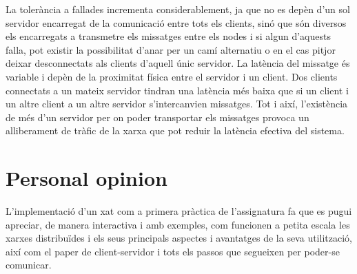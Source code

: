 \documentclass[a4paper, 10pt]{article}
\begin{document}
\begin{enumerate}
La tolerància a fallades incrementa considerablement, ja que no es depèn d’un sol servidor encarregat de la comunicació entre tots els clients, sinó que són diversos els encarregats a transmetre els missatges entre els nodes i si algun d’aquests falla, pot existir la possibilitat d’anar per un camí alternatiu o en el cas pitjor deixar desconnectats als clients d’aquell únic servidor.
La latència del missatge és variable i depèn de la proximitat física entre el servidor i un client. Dos clients connectats a un mateix servidor tindran una latència més baixa que si un client i un altre client a un altre servidor s’intercanvien missatges. Tot i així, l’existència de més d’un servidor per on poder transportar els missatges provoca un alliberament de tràfic de la xarxa que pot reduir la latència efectiva del sistema.


\end{enumerate}

\section{Personal opinion}
L’implementació d’un xat com a primera pràctica de l’assignatura fa que es pugui apreciar, de manera interactiva i amb exemples, com funcionen a petita escala les xarxes distribuïdes i els seus principals aspectes i avantatges de la seva utilització, així com el paper de client-servidor i tots els passos que segueixen per poder-se comunicar.
\end{document}
